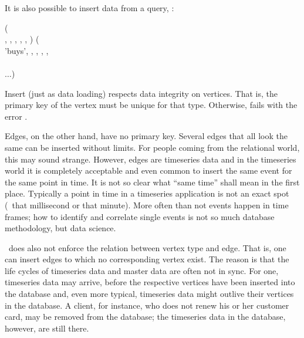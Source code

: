 It is also possible  to insert data from
a query, \eg:

\begin{minipage}{\textwidth}
  ( \\
                      ,
                      ,
                      ,
                      ,
                      ,
                      ) (\\
\hspace*{0.2cm} 'buys', , 
                         ,
                         ,
                         ,
                          \\
\hspace*{0.35cm}  \\
\hspace*{0.2cm} $\dots$)
\end{minipage}

Insert (just as data loading) respects data integrity
on vertices. That is, the primary key of the vertex
must be unique for that type. Otherwise, 
fails with the error .

Edges, on the other hand, have no primary key.
Several edges that all look the same can be inserted
without limits. For people coming from the relational
world, this may sound strange. However, edges are
timeseries data and in the timeseries world
it is completely acceptable and
even common to insert the same event for the same
point in time. It is not so clear 
what ``same time'' shall mean in the first place.
Typically a point in time in a timeseries application
is not an exact spot (\eg\ that millisecond or that
minute). More often than not events happen in
time frames; how to identify and correlate single events
is not so much database methodology, but data science.

\nowdb\ does also not enforce the relation between
vertex type and edge. That is, one can insert edges
to which no corresponding vertex exist.
The reason is that the life cycles of timeseries data
and master data are often not in sync.
For one, timeseries data may arrive, before the
respective vertices have been inserted into the database
and, even more typical, timeseries data might
outlive their vertices in the database.
A client, for instance, who does not renew his or her
customer card, may be removed from the database;
the timeseries data in the database, however,
are still there.

